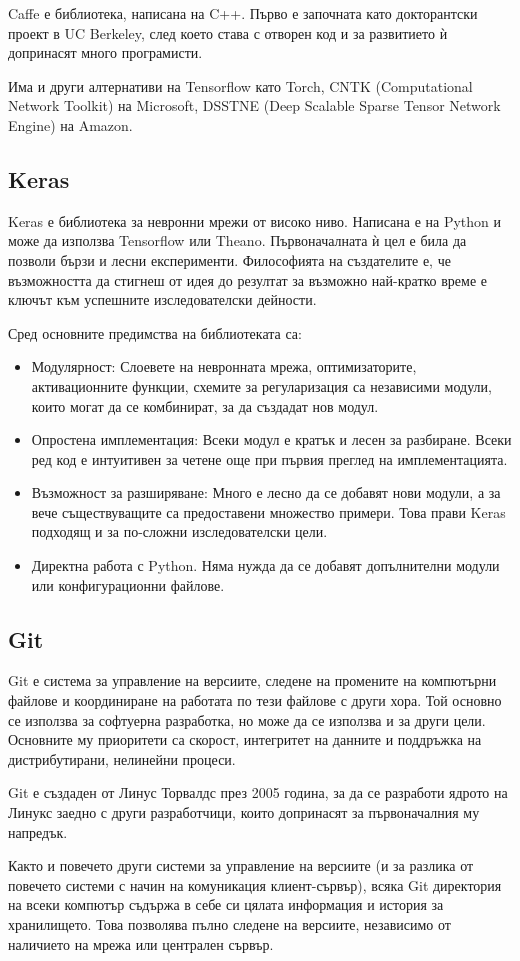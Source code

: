 Caffe е библиотека, написана на C++. Първо е започната като докторантски проект в UC Berkeley, след което става с отворен код и за развитието ѝ допринасят много програмисти.

Има и други алтернативи на Tensorflow като Torch, CNTK (Computational Network Toolkit) на Microsoft, DSSTNE (Deep Scalable Sparse Tensor Network Engine) на Amazon.

\subsection{Keras}

Keras е библиотека за невронни мрежи от високо ниво. Написана е на Python и може да използва Tensorflow или Theano. Първоначалната ѝ цел е била да позволи бързи и лесни експерименти. Философията на създателите е, че възможността да стигнеш от идея до резултат за възможно най-кратко време е ключът към успешните изследователски дейности.

Сред основните предимства на библиотеката са:
\begin{itemize}
\item Модулярност: Слоевете на невронната мрежа, оптимизаторите, активационните функции, схемите за регуларизация са независими модули, които могат да се комбинират, за да създадат нов модул.
\item Опростена имплементация: Всеки модул е кратък и лесен за разбиране. Всеки ред код е интуитивен за четене още при първия преглед на имплементацията.
\item Възможност за разширяване: Много е лесно да се добавят нови модули, а за вече съществуващите са предоставени множество примери. Това прави Keras подходящ и за по-сложни изследователски цели.
\item Директна работа с Python. Няма нужда да се добавят допълнителни модули или конфигурационни файлове.
\end{itemize}

\subsection{Git}

Git е система за управление на версиите, следене на промените на компютърни файлове и координиране на работата по тези файлове с други хора. Той основно се използва за софтуерна разработка, но може да се използва и за други цели. Основните му приоритети са скорост, интегритет на данните и поддръжка на дистрибутирани, нелинейни процеси.

Git е създаден от Линус Торвалдс през 2005 година, за да се разработи ядрото на Линукс заедно с други разработчици, които допринасят за първоначалния му напредък.

Както и повечето други системи за управление на версиите (и за разлика от повечето системи с начин на комуникация клиент-сървър), всяка Git директория на всеки компютър съдържа в себе си цялата информация и история за хранилището. Това позволява пълно следене на версиите, независимо от наличието на мрежа или централен сървър.

